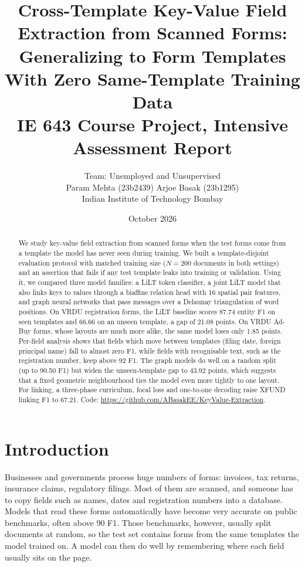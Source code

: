 \documentclass[11pt,a4paper]{article}
\title{\textbf{Cross-Template Key-Value Field Extraction from Scanned Forms:\\
Generalizing to Form Templates With Zero Same-Template Training Data}\\[6pt]
\large IE 643 Course Project, Intensive Assessment Report}
\author{Team: Unemployed and Unsupervised\\[4pt]
Param Mehta (23b2439) \quad Arjoe Basak (23b1295)\\[4pt]
Indian Institute of Technology Bombay}
\date{October 2026}
\begin{document}
\maketitle

\begin{abstract}
We study key-value field extraction from scanned forms when the test forms come from a template the model has never seen during training. We built a template-disjoint evaluation protocol with matched training size ($N=200$ documents in both settings) and an assertion that fails if any test template leaks into training or validation. Using it, we compared three model families: a LiLT token classifier, a joint LiLT model that also links keys to values through a biaffine relation head with 16 spatial pair features, and graph neural networks that pass messages over a Delaunay triangulation of word positions. On VRDU registration forms, the LiLT baseline scores 87.74 entity F1 on seen templates and 66.66 on an unseen template, a gap of 21.08 points. On VRDU Ad-Buy forms, whose layouts are much more alike, the same model loses only 1.85 points. Per-field analysis shows that fields which move between templates (filing date, foreign principal name) fall to almost zero F1, while fields with recognisable text, such as the registration number, keep above 92 F1. The graph models do well on a random split (up to 90.50 F1) but widen the unseen-template gap to 43.92 points, which suggests that a fixed geometric neighbourhood ties the model even more tightly to one layout. For linking, a three-phase curriculum, focal loss and one-to-one decoding raise XFUND linking F1 to 67.21. Code: \url{https://github.com/ABasakEE/KeyValue-Extraction}.
\end{abstract}

\section{Introduction}

Businesses and governments process huge numbers of forms: invoices, tax returns, insurance claims, regulatory filings. Most of them are scanned, and someone has to copy fields such as names, dates and registration numbers into a database. Models that read these forms automatically have become very accurate on public benchmarks, often above 90 F1. Those benchmarks, however, usually split documents at random, so the test set contains forms from the same templates the model trained on. A model can then do well by remembering where each field usually sits on the page.
\end{document}
